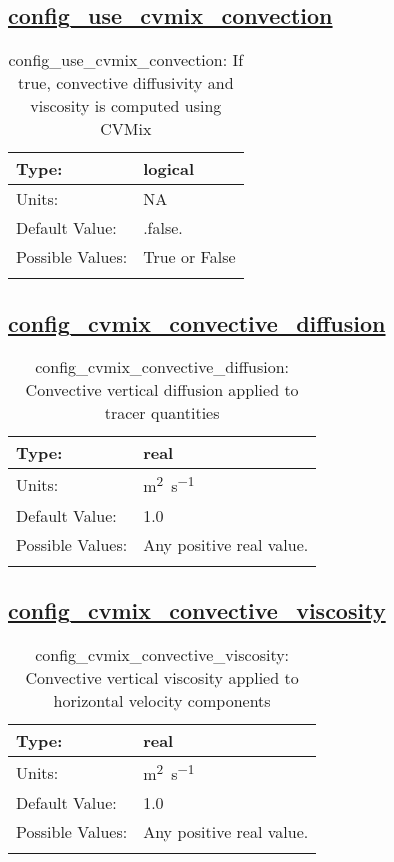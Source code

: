\subsection[config\_use\_cvmix\_convection]{\hyperref[sec:nm_tab_cvmix]{config\_use\_cvmix\_convection}}
\label{subsec:nm_sec_config_use_cvmix_convection}
\begin{center}
\begin{longtable}{| p{2.0in} || p{4.0in} |}
    \hline
    Type: & logical \\
    \hline
    Units: & \si{NA} \\
    \hline
    Default Value: & .false. \\
    \hline
    Possible Values: & True or False \\
    \hline
    \caption{config\_use\_cvmix\_convection: If true, convective diffusivity and viscosity is computed using CVMix}
\end{longtable}
\end{center}
\subsection[config\_cvmix\_convective\_diffusion]{\hyperref[sec:nm_tab_cvmix]{config\_cvmix\_convective\_diffusion}}
\label{subsec:nm_sec_config_cvmix_convective_diffusion}
\begin{center}
\begin{longtable}{| p{2.0in} || p{4.0in} |}
    \hline
    Type: & real \\
    \hline
    Units: & \si{m^2.s^{-1}} \\
    \hline
    Default Value: & 1.0 \\
    \hline
    Possible Values: & Any positive real value. \\
    \hline
    \caption{config\_cvmix\_convective\_diffusion: Convective vertical diffusion applied to tracer quantities}
\end{longtable}
\end{center}
\subsection[config\_cvmix\_convective\_viscosity]{\hyperref[sec:nm_tab_cvmix]{config\_cvmix\_convective\_viscosity}}
\label{subsec:nm_sec_config_cvmix_convective_viscosity}
\begin{center}
\begin{longtable}{| p{2.0in} || p{4.0in} |}
    \hline
    Type: & real \\
    \hline
    Units: & \si{m^2.s^{-1}} \\
    \hline
    Default Value: & 1.0 \\
    \hline
    Possible Values: & Any positive real value. \\
    \hline
    \caption{config\_cvmix\_convective\_viscosity: Convective vertical viscosity applied to horizontal velocity components}
\end{longtable}
\end{center}
